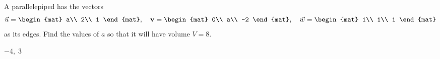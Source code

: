 
\begin{Exercise}[
name={},
title={}, 
difficulty=0,
origin={\cite{AG}}]
A parallelepiped has the vectors
$$
\vec{u}=
\begin{mat}
a\\
2\\
1
\end{mat}
,\quad
\mathbf{v}=
\begin{mat}
0\\
a\\
-2
\end{mat}
,\quad
\vec{w}=
\begin{mat}
1\\
1\\
1
\end{mat}
$$
as its edges. Find the values of $a$ so that it will have volume $V=8$.
\end{Exercise}

\begin{Answer}
$-4,\;3$
\end{Answer}
